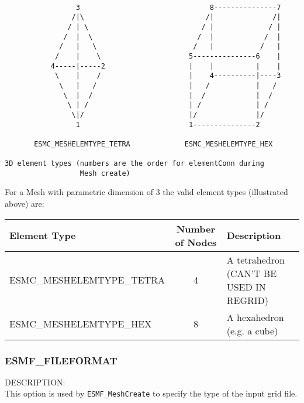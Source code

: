 \begin{verbatim}
                                            
                 3                               8---------------7
                /|\                             /|              /|
               / | \                           / |             / |
              /  |  \                         /  |            /  |
             /   |   \                       /   |           /   |
            /    |    \                     5---------------6    |
           4-----|-----2                    |    |          |    |
            \    |    /                     |    4----------|----3
             \   |   /                      |   /           |   /
              \  |  /                       |  /            |  /
               \ | /                        | /             | /
                \|/                         |/              |/
                 1                          1---------------2

       ESMC_MESHELEMTYPE_TETRA             ESMC_MESHELEMTYPE_HEX  

3D element types (numbers are the order for elementConn during 
                  Mesh create)

\end{verbatim}

For a Mesh with parametric dimension of 3 the valid element types (illustrated above) are:

\smallskip

\begin{tabular}{|l|c|l|}
\hline
Element Type & Number of Nodes & Description \\
\hline
ESMC\_MESHELEMTYPE\_TETRA & 4 & A tetrahedron (CAN'T BE USED IN REGRID) \\
ESMC\_MESHELEMTYPE\_HEX  & 8 & A hexahedron (e.g. a cube) \\
\hline
\end{tabular}


\subsubsection{ESMF\_FILEFORMAT}
\label{const:mesh:cfileformat}

{\sf DESCRIPTION:\\}
This option is used by {\tt ESMF\_MeshCreate} to specify the type of the input grid file.  

